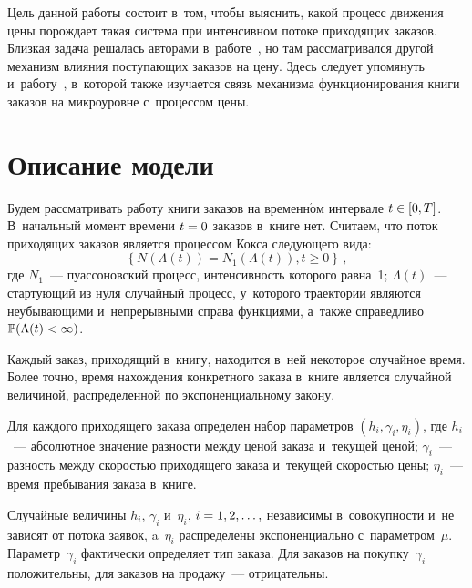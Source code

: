\begin{multicols}{2}
Цель данной работы состоит в~том, чтобы выяснить, какой процесс движения цены 
порождает такая сис\-те\-ма при интенсивном потоке приходящих заказов.
Близкая задача решалась авторами в~работе~\cite{second}, но там рас\-смат\-ри\-вал\-ся 
другой механизм влияния по\-сту\-па\-ющих заказов на цену. Здесь следует упомянуть 
и~работу~\cite{Korolev1}, в~которой также изуча\-ет\-ся связь механизма 
функционирования книги заказов на микроуровне с~процессом цены.

\vspace*{-12pt}

\section{Описание модели}

\vspace*{-4pt}

Будем рассматривать работу книги заказов на временн$\acute{\mbox{о}}$м интервале $t\hm\in[0,T]$. 
В~начальный момент времени $t\hm=0$ заказов в~книге нет. Считаем, что поток 
приходящих заказов является процессом Кокса следующего вида:
\begin{equation*}
\left\{N(\Lambda(t))=N_1(\Lambda(t)), t\geqslant0\right\}\,,
\end{equation*}
где
$N_1$~--- пуассоновский процесс, интенсивность которого равна~1; 
$\Lambda(t)$~--- стартующий из нуля случайный процесс, у~которого траектории 
являются неубывающими и~непрерывными справа функциями, а~также справедливо 
$\mathbb{P}(\Lambda(t)\hm<\infty)$.

Каждый заказ, приходящий в~книгу, находится в~ней некоторое случайное время. 
Более точно, время нахождения конкретного заказа в~книге является случайной 
величиной, распределенной по экспоненциальному закону.

Для каждого приходящего заказа определен набор параметров $(h_i, \gamma_i, \eta_i)$, 
где 
$h_i$~--- абсолютное значение разности между ценой заказа и~текущей ценой; 
$\gamma_i$~--- разность между ско\-ростью приходящего заказа и~текущей ско\-ростью цены; 
$\eta_i$~--- время пребывания заказа в~книге. 

Случайные величины $h_i$, $\gamma_i$ и~$\eta_i$, $i\hm=1, 2, \ldots,$ независимы 
в~совокупности и~не зависят от потока заявок, a~$\eta_i$ распределены 
экспоненциально с~параметром~$\mu$. Параметр~$\gamma_i$ фактически определяет 
тип заказа. Для заказов на покупку~$\gamma_i$ положительны, для заказов на 
продажу~--- отрицательны.


\end{multicols}
